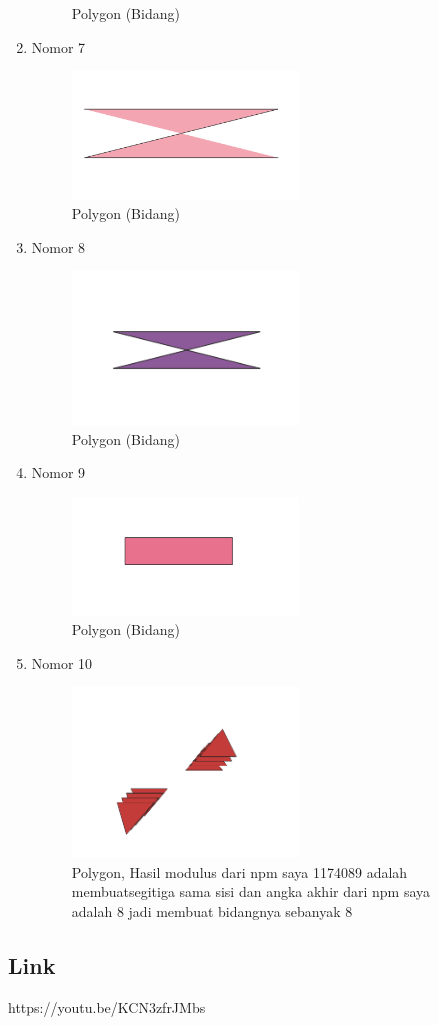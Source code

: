 \begin{enumerate}
\begin{figure}[H]
		\centering
		\caption{Polygon (Bidang)}
	\end{figure}
	\item Nomor 7
	
	\begin{figure}[H]
		\includegraphics[width=6cm]{figures/Tugas2/1174089/7.PNG}
		\centering
		\caption{Polygon (Bidang)}
	\end{figure}
	\item Nomor 8
	
	\begin{figure}[H]
		\includegraphics[width=6cm]{figures/Tugas2/1174089/8.PNG}
		\centering
		\caption{Polygon (Bidang)}
	\end{figure}
	\item Nomor 9
	
	\begin{figure}[H]
		\includegraphics[width=6cm]{figures/Tugas2/1174089/9.PNG}
		\centering
		\caption{Polygon (Bidang)}
	\end{figure}
	\item Nomor 10
	
	\begin{figure}[H]
		\includegraphics[width=6cm]{figures/Tugas2/1174089/10.PNG}
		\centering
		\caption{Polygon, Hasil modulus dari npm saya 1174089 adalah  membuatsegitiga sama sisi dan angka akhir dari npm saya adalah 8 jadi membuat bidangnya sebanyak 8}
	\end{figure}
\end{enumerate}
\subsection{Link}
https://youtu.be/KCN3zfrJMbs